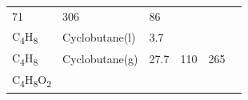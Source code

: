 \documentclass[
]{book}
\theoremstyle{definition}
\theoremstyle{definition}
\theoremstyle{definition}
\theoremstyle{remark}
\begin{document}
\begin{longtable}[]{@{}llllll@{}}
\begin{minipage}[t]{0.15\columnwidth}
71\strut
\end{minipage} & \begin{minipage}[t]{0.14\columnwidth}\raggedright
306\strut
\end{minipage} & \begin{minipage}[t]{0.14\columnwidth}\raggedright
86\strut
\end{minipage}\tabularnewline
\begin{minipage}[t]{0.07\columnwidth}\raggedright
C\textsubscript{4}H\textsubscript{8}\strut
\end{minipage} & \begin{minipage}[t]{0.17\columnwidth}\raggedright
Cyclobutane(l)\strut
\end{minipage} & \begin{minipage}[t]{0.15\columnwidth}\raggedright
3.7\strut
\end{minipage} & \begin{minipage}[t]{0.15\columnwidth}\raggedright
\strut
\end{minipage} & \begin{minipage}[t]{0.14\columnwidth}\raggedright
\strut
\end{minipage} & \begin{minipage}[t]{0.14\columnwidth}\raggedright
\strut
\end{minipage}\tabularnewline
\begin{minipage}[t]{0.07\columnwidth}\raggedright
C\textsubscript{4}H\textsubscript{8}\strut
\end{minipage} & \begin{minipage}[t]{0.17\columnwidth}\raggedright
Cyclobutane(g)\strut
\end{minipage} & \begin{minipage}[t]{0.15\columnwidth}\raggedright
27.7\strut
\end{minipage} & \begin{minipage}[t]{0.15\columnwidth}\raggedright
110\strut
\end{minipage} & \begin{minipage}[t]{0.14\columnwidth}\raggedright
265\strut
\end{minipage} & \begin{minipage}[t]{0.14\columnwidth}\raggedright
\strut
\end{minipage}\tabularnewline
\begin{minipage}[t]{0.07\columnwidth}\raggedright
C\textsubscript{4}H\textsubscript{8}O\textsubscript{2}\strut
\end{minipage} & \begin{minipage}[t]{0.17\columnwidth}\raggedright

\end{minipage}
\end{longtable}
\end{document}
